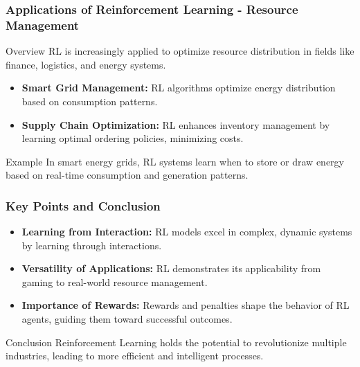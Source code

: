 \documentclass[aspectratio=169]{beamer}
\begin{document}
\begin{frame}[fragile]
    \frametitle{Applications of Reinforcement Learning - Resource Management}
    \begin{block}{Overview}
        RL is increasingly applied to optimize resource distribution in fields like finance, logistics, and energy systems.
    \end{block}

    \begin{itemize}
        \item \textbf{Smart Grid Management:} 
        RL algorithms optimize energy distribution based on consumption patterns.
        
        \item \textbf{Supply Chain Optimization:}
        RL enhances inventory management by learning optimal ordering policies, minimizing costs.
    \end{itemize}

    \begin{block}{Example}
        In smart energy grids, RL systems learn when to store or draw energy based on real-time consumption and generation patterns.
    \end{block}
\end{frame}

\begin{frame}[fragile]
    \frametitle{Key Points and Conclusion}
    \begin{itemize}
        \item \textbf{Learning from Interaction:} 
        RL models excel in complex, dynamic systems by learning through interactions.
        
        \item \textbf{Versatility of Applications:} 
        RL demonstrates its applicability from gaming to real-world resource management.
        
        \item \textbf{Importance of Rewards:} 
        Rewards and penalties shape the behavior of RL agents, guiding them toward successful outcomes.
    \end{itemize}

    \begin{block}{Conclusion}
        Reinforcement Learning holds the potential to revolutionize multiple industries, leading to more efficient and intelligent processes.
    \end{block}
\end{frame}
\end{document}
